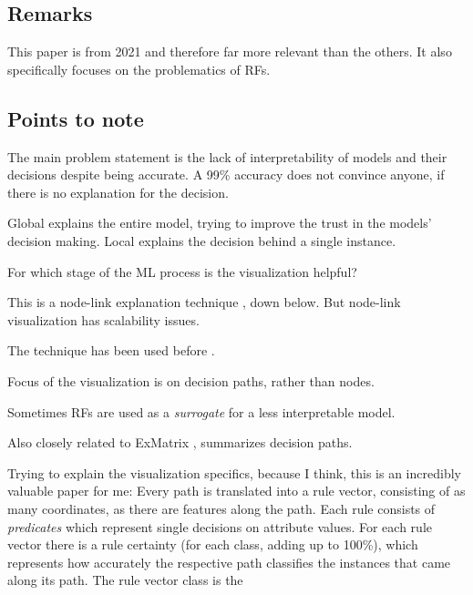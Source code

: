 \documentclass[a4paper, 12pt]{article}
\begin{document}
\subsection{Remarks}
This paper is from 2021 and therefore far more relevant than the others. It also specifically focuses on the
problematics of RFs.

\subsection{Points to note}
\begin{description}[font=$\bullet$~\normalfont]
    \item[Model interpretability:]The main problem statement is the lack of interpretability of models and their
            decisions despite being accurate. A 99\% accuracy does not convince anyone, if there is no
            explanation for the decision.
    \item [Global/Local approaches:]Global explains the entire model, trying to improve the trust in the models'
            decision making. Local explains the decision behind a single instance.
    \item[pre-/in-/post-model strategies:]For which stage of the ML process is the visualization helpful?
    \item[BaobabView:]This is a node-link explanation technique \cite{van2011baobabview}, down below. But node-link
            visualization has scalability issues.
    \item [RuleMatrix:]The technique has been used before \cite{ming2018rulematrix}.
    \item [Decision Paths:]Focus of the visualization is on decision paths, rather than nodes.
    \item [Surrogates:]Sometimes RFs are used as a \textit{surrogate} for a less interpretable model.
    \item [iForest:]Also closely related to ExMatrix \cite{zhao2018iforest}, summarizes decision paths.
\end{description}
Trying to explain the visualization specifics, because I think, this is an incredibly valuable paper for me:
Every path is translated into a rule vector, consisting of as many coordinates, as there are features along the 
path. Each rule consists of \textit{predicates} which represent single decisions on attribute values. 
For each rule vector there is a rule certainty (for each class, adding up to 100\%), which represents how
accurately the respective path classifies the instances that came along its path. The rule vector class is the
\end{document}
